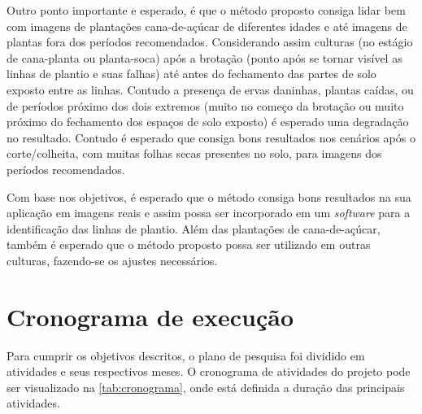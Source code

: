 \documentclass[12pt, a4paper, english, brazil]{article}
\begin{document}
Outro ponto importante e esperado, é que o método proposto consiga lidar bem com imagens de plantações cana-de-açúcar de diferentes idades e até imagens de plantas fora dos períodos recomendados. Considerando assim culturas (no estágio de cana-planta ou planta-soca) após a brotação (ponto após se tornar visível as linhas de plantio e suas falhas) até antes do fechamento das partes de solo exposto entre as linhas. Contudo a presença de ervas daninhas, plantas caídas, ou de períodos próximo dos dois extremos (muito no começo da brotação ou muito próximo do fechamento dos espaços de solo exposto) é esperado uma degradação no resultado. Contudo é esperado que consiga bons resultados nos cenários após o corte/colheita, com muitas folhas secas presentes no solo, para imagens dos períodos recomendados.

Com base nos objetivos, é esperado que o método consiga bons resultados na sua aplicação em imagens reais e assim possa ser incorporado em um \textit{software} para a identificação das linhas de plantio. Além das plantações de cana-de-açúcar, também é esperado que o método proposto possa ser utilizado em outras culturas, fazendo-se os ajustes necessários.


\section{Cronograma de execução}

Para cumprir os objetivos descritos, o plano de pesquisa foi dividido em atividades e seus respectivos meses. O cronograma de atividades do projeto pode ser visualizado na \autoref{tab:cronograma}, onde está definida a
duração das principais atividades.
\end{document}
